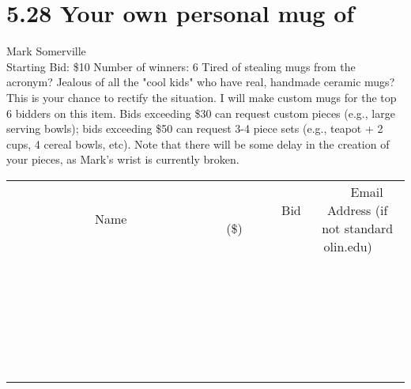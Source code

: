 \documentclass[11pt]{article}
\begin{document}
\section*{5.28 Your own personal mug of}
Mark Somerville
\\
Starting Bid: \$10
\newline
Number of winners: 6
\newline
Tired of stealing mugs from the acronym? Jealous of all the "cool kids" who have real, handmade ceramic mugs?  This is your chance to rectify the situation. I will make custom mugs for the top 6 bidders on this item.  Bids exceeding \$30 can request custom pieces (e.g., large serving bowls); bids exceeding \$50 can request 3-4 piece sets (e.g., teapot + 2 cups, 4 cereal bowls, etc).  Note that there will be some delay in the creation of your pieces, as Mark's wrist is currently broken.
\\[6ex]
\begin{tabular}{c c c}
~~~~~~~~~~~~~Name~~~~~~~~~~~~~ & ~~~~~~~~~Bid (\$)~~~~~~~~~  & ~~~Email Address (if not standard olin.edu)~~~\\
 & & \\
\hline
 & & \\
\hline
 & & \\
\hline
 & & \\
\hline
 & & \\
\hline
 & & \\
\hline
 & & \\
\hline
 & & \\
\hline
 & & \\
\hline
 & & \\
\hline
 & & \\
\hline
 & & \\
\hline
 & & \\
\hline
 & & \\
\hline
 & & \\
\hline
 & & \\
\hline
 & & \\
\hline
 & & \\
\hline
 & & \\
\hline
 & & \\
\hline
 & & \\
\hline
 & & \\
\hline
 & & \\
\hline
 & & \\
\hline
 & & \\
\hline
 & & \\
\hline
\end{tabular}
\newpage
\end{document}
